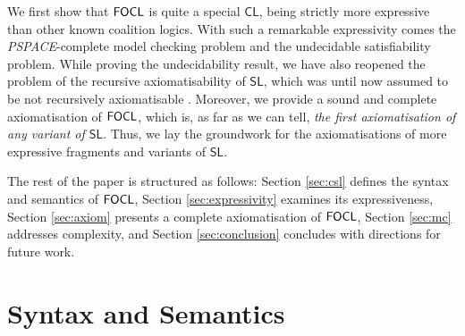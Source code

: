 \documentclass{article}
\begin{document}
We first show that %
$\mathsf{FOCL}$ is  quite a special $\mathsf{CL}$, being strictly more expressive than other known coalition logics. With such a remarkable expressivity comes the \textit{PSPACE}-complete model checking problem and the undecidable satisfiability problem. While proving the undecidability result, we have also reopened the problem of the recursive axiomatisability of $\mathsf{SL}$, which was until now assumed to be not recursively axiomatisable \cite{mogavero10}. Moreover, we provide a sound and complete axiomatisation of $\mathsf{FOCL}$, which is, as far as we can tell, \textit{the first axiomatisation of any variant of $\mathsf{SL}$}. %
Thus,
we lay the groundwork for the  axiomatisations of more expressive fragments and variants of $\mathsf{SL}$.  

The rest of the paper is structured as follows: Section \ref{sec:csl} defines the syntax and semantics of $\mathsf{FOCL}$, Section \ref{sec:expressivity} examines its expressiveness, Section \ref{sec:axiom} presents a complete axiomatisation of $\mathsf{FOCL}$, Section \ref{sec:mc} addresses complexity, and Section \ref{sec:conclusion} concludes with directions for future work.
%


\section{Syntax and Semantics}

\end{document}
